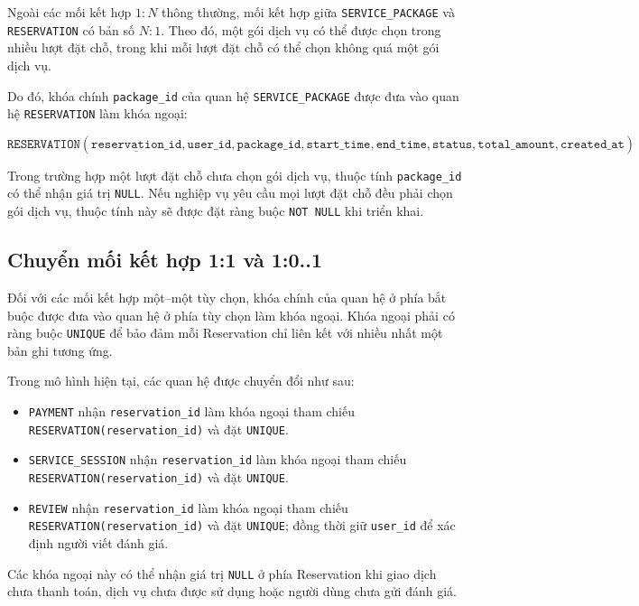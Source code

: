 Ngoài các mối kết hợp \(1:N\) thông thường, mối kết hợp giữa \texttt{SERVICE\_PACKAGE} và \texttt{RESERVATION} có bản số \(N:1\). Theo đó, một gói dịch vụ có thể được chọn trong nhiều lượt đặt chỗ, trong khi mỗi lượt đặt chỗ có thể chọn không quá một gói dịch vụ.

Do đó, khóa chính \texttt{package\_id} của quan hệ \texttt{SERVICE\_PACKAGE} được đưa vào quan hệ \texttt{RESERVATION} làm khóa ngoại:

\[
\texttt{RESERVATION}(
\underline{\texttt{reservation\_id}},
\texttt{user\_id},
\texttt{package\_id},
\texttt{start\_time},
\texttt{end\_time},
\texttt{status},
\texttt{total\_amount},
\texttt{created\_at}
)
\]

Trong trường hợp một lượt đặt chỗ chưa chọn gói dịch vụ, thuộc tính \texttt{package\_id} có thể nhận giá trị \texttt{NULL}. Nếu nghiệp vụ yêu cầu mọi lượt đặt chỗ đều phải chọn gói dịch vụ, thuộc tính này sẽ được đặt ràng buộc \texttt{NOT NULL} khi triển khai.

\subsection{Chuyển mối kết hợp 1:1 và 1:0..1}

Đối với các mối kết hợp một--một tùy chọn, khóa chính của quan hệ ở phía bắt buộc được đưa vào quan hệ ở phía tùy chọn làm khóa ngoại. Khóa ngoại phải có ràng buộc \texttt{UNIQUE} để bảo đảm mỗi Reservation chỉ liên kết với nhiều nhất một bản ghi tương ứng.

Trong mô hình hiện tại, các quan hệ được chuyển đổi như sau:

\begin{itemize}
    \item \texttt{PAYMENT} nhận \texttt{reservation\_id} làm khóa ngoại tham chiếu \texttt{RESERVATION(reservation\_id)} và đặt \texttt{UNIQUE}.
    \item \texttt{SERVICE\_SESSION} nhận \texttt{reservation\_id} làm khóa ngoại tham chiếu \texttt{RESERVATION(reservation\_id)} và đặt \texttt{UNIQUE}.
    \item \texttt{REVIEW} nhận \texttt{reservation\_id} làm khóa ngoại tham chiếu \texttt{RESERVATION(reservation\_id)} và đặt \texttt{UNIQUE}; đồng thời giữ \texttt{user\_id} để xác định người viết đánh giá.
\end{itemize}

Các khóa ngoại này có thể nhận giá trị \texttt{NULL} ở phía Reservation khi giao dịch chưa thanh toán, dịch vụ chưa được sử dụng hoặc người dùng chưa gửi đánh giá.

